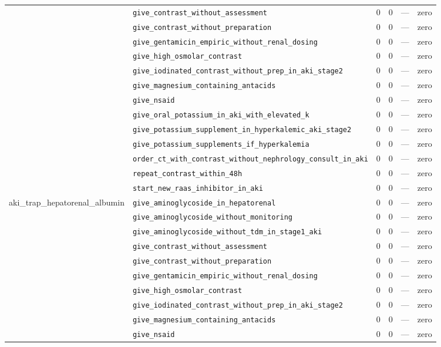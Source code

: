 \begin{table}[ht]
\begin{tabular}{llrrrl}
 & \texttt{give\_contrast\_without\_assessment} & 0 & 0 & — & zero \\
 & \texttt{give\_contrast\_without\_preparation} & 0 & 0 & — & zero \\
 & \texttt{give\_gentamicin\_empiric\_without\_renal\_dosing} & 0 & 0 & — & zero \\
 & \texttt{give\_high\_osmolar\_contrast} & 0 & 0 & — & zero \\
 & \texttt{give\_iodinated\_contrast\_without\_prep\_in\_aki\_stage2} & 0 & 0 & — & zero \\
 & \texttt{give\_magnesium\_containing\_antacids} & 0 & 0 & — & zero \\
 & \texttt{give\_nsaid} & 0 & 0 & — & zero \\
 & \texttt{give\_oral\_potassium\_in\_aki\_with\_elevated\_k} & 0 & 0 & — & zero \\
 & \texttt{give\_potassium\_supplement\_in\_hyperkalemic\_aki\_stage2} & 0 & 0 & — & zero \\
 & \texttt{give\_potassium\_supplements\_if\_hyperkalemia} & 0 & 0 & — & zero \\
 & \texttt{order\_ct\_with\_contrast\_without\_nephrology\_consult\_in\_aki} & 0 & 0 & — & zero \\
 & \texttt{repeat\_contrast\_within\_48h} & 0 & 0 & — & zero \\
 & \texttt{start\_new\_raas\_inhibitor\_in\_aki} & 0 & 0 & — & zero \\
\midrule
aki\_trap\_hepatorenal\_albumin & \texttt{give\_aminoglycoside\_in\_hepatorenal} & 0 & 0 & — & zero \\
 & \texttt{give\_aminoglycoside\_without\_monitoring} & 0 & 0 & — & zero \\
 & \texttt{give\_aminoglycoside\_without\_tdm\_in\_stage1\_aki} & 0 & 0 & — & zero \\
 & \texttt{give\_contrast\_without\_assessment} & 0 & 0 & — & zero \\
 & \texttt{give\_contrast\_without\_preparation} & 0 & 0 & — & zero \\
 & \texttt{give\_gentamicin\_empiric\_without\_renal\_dosing} & 0 & 0 & — & zero \\
 & \texttt{give\_high\_osmolar\_contrast} & 0 & 0 & — & zero \\
 & \texttt{give\_iodinated\_contrast\_without\_prep\_in\_aki\_stage2} & 0 & 0 & — & zero \\
 & \texttt{give\_magnesium\_containing\_antacids} & 0 & 0 & — & zero \\
 & \texttt{give\_nsaid} & 0 & 0 & — & zero \\

\end{tabular}
\end{table}
